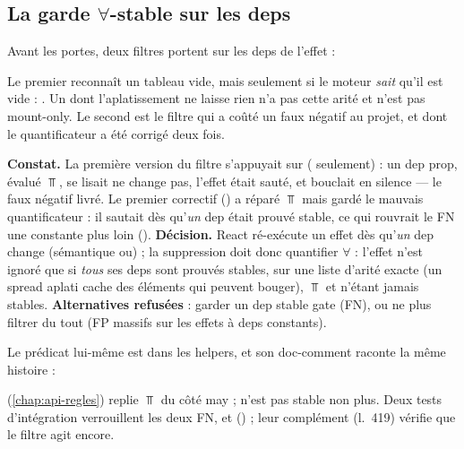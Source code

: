 \subsection{La garde $\forall$-stable sur les deps}
\label{sec:infinite-loop-deps}

Avant les portes, deux filtres portent sur les deps de l'effet :


Le premier reconnaît un tableau vide, mais seulement si le moteur \emph{sait} qu'il est vide : . Un \code{[...xs]} dont l'aplatissement ne laisse rien n'a pas cette arité et n'est pas mount-only. Le second est le filtre qui a coûté un faux négatif au projet, et dont le quantificateur a été corrigé deux fois.

\begin{decision}
\textbf{Constat.} La première version du filtre s'appuyait sur  ( seulement) : un dep prop, évalué $\Top$, se lisait \og ne change pas\fg, l'effet était sauté, et  bouclait en silence --- le faux négatif livré. Le premier correctif () a réparé $\Top$ mais gardé le mauvais quantificateur : il sautait dès qu'\emph{un} dep était prouvé stable, ce qui rouvrait le FN une constante plus loin ().
\textbf{Décision.} React ré-exécute un effet dès qu'\emph{un} dep change (sémantique \og ou\fg) ; la suppression doit donc quantifier $\forall$ : l'effet n'est ignoré que si \emph{tous} ses deps sont prouvés stables, sur une liste d'arité exacte (un spread aplati cache des éléments qui peuvent bouger), $\Top$ et  n'étant jamais stables. \textbf{Alternatives refusées} : garder \og un dep stable gate\fg{} (FN), ou ne plus filtrer du tout (FP massifs sur les effets à deps constants).
\end{decision}

Le prédicat lui-même est dans les helpers, et son doc-comment raconte la même histoire :


 (\cref{chap:api-regles}) replie $\Top$ du côté may ;  n'est pas stable non plus. Deux tests d'intégration verrouillent les deux FN,  et  () ; leur complément  (l.~419) vérifie que le filtre agit encore.

